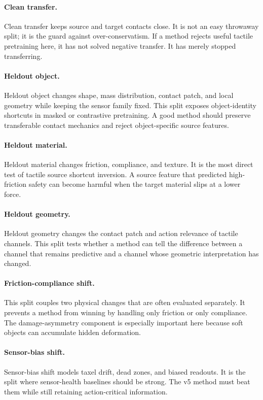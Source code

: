 \documentclass{article}
\begin{document}
\paragraph{Clean transfer.}
Clean transfer keeps source and target contacts close. It is not an easy throwaway split; it is the guard against over-conservatism. If a method rejects useful tactile pretraining here, it has not solved negative transfer. It has merely stopped transferring.

\paragraph{Heldout object.}
Heldout object changes shape, mass distribution, contact patch, and local geometry while keeping the sensor family fixed. This split exposes object-identity shortcuts in masked or contrastive pretraining. A good method should preserve transferable contact mechanics and reject object-specific source features.

\paragraph{Heldout material.}
Heldout material changes friction, compliance, and texture. It is the most direct test of tactile source shortcut inversion. A source feature that predicted high-friction safety can become harmful when the target material slips at a lower force.

\paragraph{Heldout geometry.}
Heldout geometry changes the contact patch and action relevance of tactile channels. This split tests whether a method can tell the difference between a channel that remains predictive and a channel whose geometric interpretation has changed.

\paragraph{Friction-compliance shift.}
This split couples two physical changes that are often evaluated separately. It prevents a method from winning by handling only friction or only compliance. The damage-asymmetry component is especially important here because soft objects can accumulate hidden deformation.

\paragraph{Sensor-bias shift.}
Sensor-bias shift models taxel drift, dead zones, and biased readouts. It is the split where sensor-health baselines should be strong. The v5 method must beat them while still retaining action-critical information.
\end{document}
